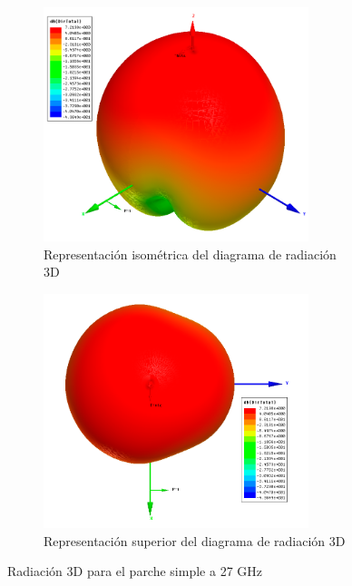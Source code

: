\begin{figure}[H]
     \centering
     \begin{subfigure}[b]{0.7\textwidth}
         \centering
         \includegraphics[width=0.85\textwidth]{archivos/analisis/1x13/6}
         \caption{Representación isométrica del diagrama de radiación 3D}
         \label{fig:3d11x13}
     \end{subfigure}
     \hfill
     \begin{subfigure}[b]{0.7\textwidth}
         \centering
         \includegraphics[width=0.85\textwidth]{archivos/analisis/1x13/7}
         \caption{Representación superior del diagrama de radiación 3D}
         \label{fig:3d21x13}
     \end{subfigure}
     \hfill
        \caption{Radiación 3D para el parche simple a 27 GHz}
        \label{fig:3d1x13}
\end{figure}

